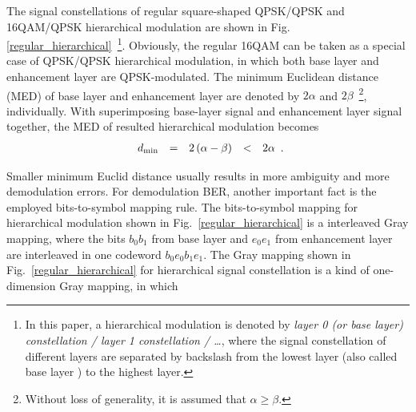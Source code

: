 \documentclass[10pt,fleqn, twocolumn]{IEEEtran}
\begin{document}
The signal constellations of regular square-shaped QPSK/QPSK and
16QAM/QPSK hierarchical modulation are shown in Fig.
\ref{regular_hierarchical}~\footnote{In this paper, a hierarchical
modulation is denoted by {\em layer 0 (or base layer)
constellation / layer 1 constellation / \ldots}, where the signal
constellation of different layers are separated by backslash from
the lowest layer (also called base layer ) to the highest layer.
}. Obviously, the regular 16QAM can be taken as a special case of
QPSK/QPSK hierarchical modulation, in which both base layer and
enhancement layer are QPSK-modulated. The minimum Euclidean
distance (MED) of base layer and enhancement layer are denoted by
$2\alpha$ and $2\beta$~\footnote{Without loss of generality, it is
assumed that $\alpha\geq\beta$.}, individually. With superimposing
base-layer signal and enhancement layer signal together, the MED
of resulted hierarchical modulation becomes
\begin{equation}
\begin{array}{rcccl}
d_{\rm min}& = & 2\left(\alpha-\beta\right) & <& 2\alpha
\end{array}.\label{Regular_MED}
\end{equation}
\begin{figure}
\end{figure}
\noindent Smaller minimum Euclid distance usually results in more
ambiguity and more demodulation errors. For demodulation BER,
another important fact is the employed bits-to-symbol mapping
rule. The bits-to-symbol mapping for hierarchical modulation shown
in Fig.~\ref{regular_hierarchical} is a interleaved Gray mapping,
where the bits $b_{0}b_{1}$ from base layer and $e_{0}e_{1}$ from
enhancement layer are interleaved in one codeword
$b_{0}e_{0}b_{1}e_{1}$. The Gray mapping shown in
Fig.~\ref{regular_hierarchical} for hierarchical signal
constellation is a kind of one-dimension Gray mapping, in which
\end{document}

